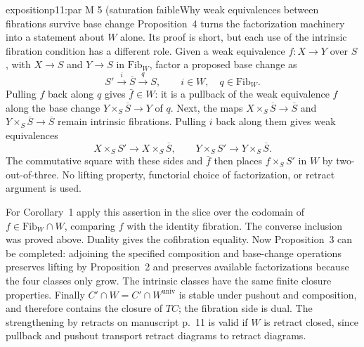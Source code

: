 \begin{dcomment}{exposition}{p11:par M 5 (saturation faible}{Why weak equivalences between fibrations survive base change}
Proposition~4 turns the factorization machinery into a statement about $W$ alone. Its proof is short, but each use of the intrinsic fibration condition has a different role. Given a weak equivalence $f:X\to Y$ over $S$, with $X\to S$ and $Y\to S$ in $\mathrm{Fib}_W$, factor a proposed base change as
\[
 S'\xrightarrow{i}\overline S\xrightarrow{q}S,
 \qquad i\in W,\quad q\in\mathrm{Fib}_W.
\]
Pulling $f$ back along $q$ gives $\bar f\in W$: it is a pullback of the weak equivalence $f$ along the base change $Y\times_S\overline S\to Y$ of $q$. Next, the maps $X\times_S\overline S\to\overline S$ and $Y\times_S\overline S\to\overline S$ remain intrinsic fibrations. Pulling $i$ back along them gives weak equivalences
\[
 X\times_SS'\longrightarrow X\times_S\overline S,
 \qquad
 Y\times_SS'\longrightarrow Y\times_S\overline S.
\]
The commutative square with these sides and $\bar f$ then places $f\times_SS'$ in $W$ by two-out-of-three. No lifting property, functorial choice of factorization, or retract argument is used.

For Corollary~1 apply this assertion in the slice over the codomain of $f\in\mathrm{Fib}_W\cap W$, comparing $f$ with the identity fibration. The converse inclusion was proved above. Duality gives the cofibration equality. Now Proposition~3 can be completed: adjoining the specified composition and base-change operations preserves lifting by Proposition~2 and preserves available factorizations because the four classes only grow. The intrinsic classes have the same finite closure properties. Finally $C'\cap W=C'\cap W^{\mathrm{univ}}$ is stable under pushout and composition, and therefore contains the closure of $TC$; the fibration side is dual. The strengthening by retracts on manuscript p.~11 is valid if $W$ is retract closed, since pullback and pushout transport retract diagrams to retract diagrams.
\end{dcomment}


